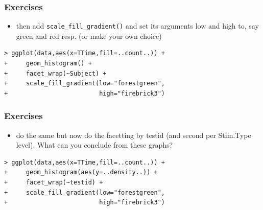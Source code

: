 \documentclass[xcolor={table},c]{beamer}
\begin{document}
\begin{frame}[fragile]\frametitle{Exercises}
  \begin{itemize}
  \item then add \texttt{scale\_fill\_gradient()} and set its arguments low and high to, say green and red resp. (or make your own choice)
  \end{itemize}\small
\begin{verbatim}
> ggplot(data,aes(x=TTime,fill=..count..)) +
+     geom_histogram() +
+     facet_wrap(~Subject) +
+     scale_fill_gradient(low="forestgreen",
+                         high="firebrick3")
\end{verbatim}
\begin{center}
\end{center}
\end{frame}


\begin{frame}[fragile]\frametitle{Exercises}
  \begin{itemize}
  \item do the same but now do the facetting by testid (and second per Stim.Type level). What can you conclude from these graphs?
  \end{itemize}
\begin{verbatim}
> ggplot(data,aes(x=TTime,fill=..count..)) +
+     geom_histogram(aes(y=..density..)) +
+     facet_wrap(~testid) +
+     scale_fill_gradient(low="forestgreen",
+                         high="firebrick3")
\end{verbatim}
\begin{center}
\end{center}
\end{frame}
\end{document}
